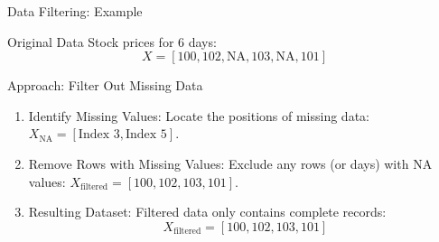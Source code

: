 \documentclass{beamer}
\begin{document}
\begin{frame}{Data Filtering: Example}
   \begin{block}{Original Data}
       Stock prices for 6 days:
       \[
       X = [100, 102, \text{NA}, 103, \text{NA}, 101]
       \]
   \end{block}

   \begin{block}{Approach: Filter Out Missing Data}
       \begin{enumerate}
           \item Identify Missing Values:
           Locate the positions of missing data:
           $X_{\text{NA}} = [\text{Index 3}, \text{Index 5}]$.

           \item Remove Rows with Missing Values:
           Exclude any rows (or days) with $\text{NA}$ values:
           $X_{\text{filtered}} = [100, 102, 103, 101]$.

           \item Resulting Dataset:
           Filtered data only contains complete records:
           \[
           X_{\text{filtered}} = [100, 102, 103, 101]
           \]
       \end{enumerate}
   \end{block}

\end{frame}
\end{document}
